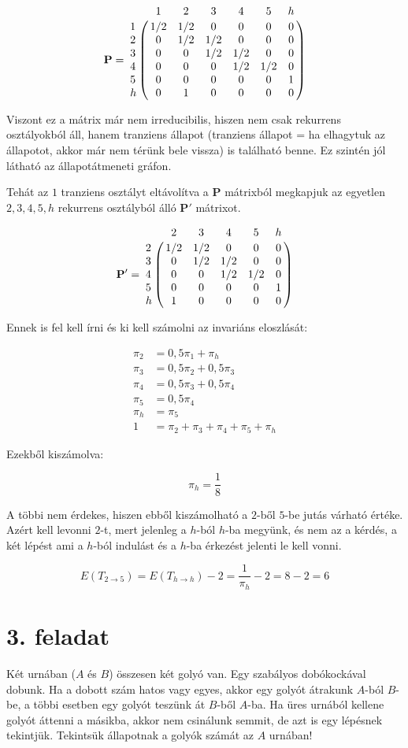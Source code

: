 \documentclass[a4paper,12pt]{article}   		%
\begin{document}
\[
\mathbf{P} = 
\bordermatrix{
~	&	1	&	2	&	3	&	4	&	5	&    h    \cr
1	&	1/2	&	1/2	&	0	&	0	&	0	&    0    \cr
2	&	0	&	1/2	&	1/2	&	0	&	0	&    0    \cr
3	&	0	&	0	&	1/2	&	1/2	&	0	&    0    \cr
4	&	0	&	0	&	0	&	1/2	&	1/2	&    0    \cr
5	&	0	&	0	&	0	&	0	&	0   &    1    \cr
h	&	0	&	1	&	0	&	0	&	0   &    0}
\]

Viszont ez a mátrix már nem irreducibilis, hiszen nem csak rekurrens
osztályokból áll, hanem tranziens állapot (tranziens állapot = ha 
elhagytuk az állapotot, akkor már nem térünk bele vissza) is található 
benne. Ez szintén jól látható az állapotátmeneti gráfon.

Tehát az ${1}$ tranziens osztályt eltávolítva a $\mathbf{P}$ mátrixból
megkapjuk az egyetlen ${2, 3, 4, 5, h}$ rekurrens osztályból álló
$\mathbf{P'}$ mátrixot.

\[
\mathbf{P'} = 
\bordermatrix{
~	&	2	&	3	&	4	&	5	&    h    \cr
2	&	1/2	&	1/2	&	0	&	0	&    0    \cr
3	&	0	&	1/2	&	1/2	&	0	&    0    \cr
4	&	0	&	0	&	1/2	&	1/2	&    0    \cr
5	&	0	&	0	&	0	&	0   &    1    \cr
h	&	1	&	0	&	0	&	0   &    0}
\]

Ennek is fel kell írni és ki kell számolni az invariáns eloszlását:

\begin{align*}
\pi_2 &= 0,5 \pi_1 + \pi_h \\
\pi_3 &= 0,5 \pi_2 + 0,5 \pi_3 \\
\pi_4 &= 0,5 \pi_3 + 0,5 \pi_4 \\
\pi_5 &= 0,5 \pi_4 \\
\pi_h &= \pi_5 \\
1 &= \pi_2 + \pi_3 + \pi_4 + \pi_5 + \pi_h
\end{align*}

Ezekből kiszámolva:

\[
\pi_h = \frac{1}{8}
\]

A többi nem érdekes, hiszen ebből kiszámolható a $2$-ből $5$-be
jutás várható értéke. Azért kell levonni $2$-t, mert jelenleg a
$h$-ból $h$-ba megyünk, és nem az a kérdés, a két lépést ami a 
$h$-ból indulást és a $h$-ba érkezést jelenti le kell vonni.

\[
E(T_{2 \to 5}) = E(T_{h \to h}) - 2 = \frac{1}{\pi_h} - 2 =
8-2 = 6
\]

\pagebreak
\section*{3. feladat}
Két urnában ($A$ és $B$) összesen két golyó van. Egy szabályos 
dobókockával dobunk. Ha a dobott szám hatos vagy egyes, akkor egy
golyót átrakunk $A$-ból $B$-be, a többi esetben egy golyót teszünk
át $B$-ből $A$-ba. Ha üres urnából kellene golyót áttenni a másikba,
akkor nem csinálunk semmit, de azt is egy lépésnek tekintjük.
Tekintsük állapotnak a golyók számát az $A$ urnában!
\end{document}
